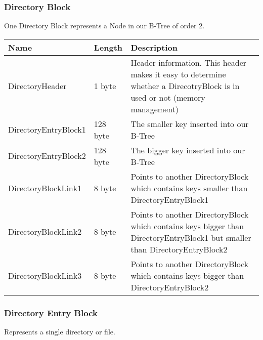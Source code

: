 \subsubsection*{Directory Block}

One Directory Block represents a Node in our B-Tree of order 2.

\begin{tabular}{|l|l|p{5cm}|}
\hline
  \textbf{Name} & \textbf{Length} & \textbf{Description}
\\  \hline

DirectoryHeader & 1 byte & Header information. This header makes it easy to determine whether a DirecotryBlock is in used or not (memory management)

\\  \hline

DirectoryEntryBlock1 & 128 byte & The smaller key inserted into our B-Tree

\\  \hline

DirectoryEntryBlock2 & 128 byte & The bigger key inserted into our B-Tree

\\  \hline

DirectoryBlockLink1 & 8 byte & Points to another DirectoryBlock which contains keys smaller than DirectoryEntryBlock1

\\  \hline

DirectoryBlockLink2 & 8 byte & Points to another DirectoryBlock which contains keys bigger than DirectoryEntryBlock1 but smaller than DirectoryEntryBlock2

\\  \hline

DirectoryBlockLink3 & 8 byte & Points to another DirectoryBlock which contains keys bigger than DirectoryEntryBlock2

\\  \hline


\end{tabular}

\subsubsection*{Directory Entry Block}

Represents a single directory or file.

